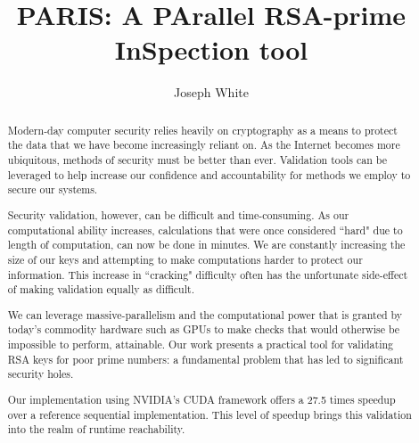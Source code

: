 \documentclass[12pt]{ucthesis}
\begin{document}
\title{PARIS: A PArallel RSA-prime InSpection tool}
\author{Joseph White}
  
 
   
 
\maketitle

\begin{frontmatter}
\copyrightpage
\committeemembershippage


\begin{abstract}

Modern-day computer security relies heavily on cryptography as a means to
protect the data that we have become increasingly reliant on. As the Internet
becomes more ubiquitous, methods of security must be better than ever.
Validation tools can be leveraged to help increase our confidence and
accountability for methods we employ to secure our systems. 

Security validation, however, can be difficult and time-consuming. As our
computational ability increases, calculations that were once considered ``hard"
due to length of computation, can now be done in minutes. We are constantly
increasing the size of our keys and attempting to make computations harder to
protect our information. This increase in ``cracking" difficulty often has the
unfortunate side-effect of making validation equally as difficult.

We can leverage massive-parallelism and the computational power that is granted
by today's commodity hardware such as GPUs to make checks that would
otherwise be impossible to perform, attainable. Our work presents a practical
tool for validating RSA keys for poor prime numbers: a fundamental problem
that has led to significant security holes.

Our implementation using NVIDIA's CUDA framework offers a 27.5 times speedup
over a reference sequential implementation. This level of speedup brings this
validation into the realm of runtime reachability.


\end{abstract}


\tableofcontents


\listoftables
\listoffigures
\end{frontmatter}
\end{document}
